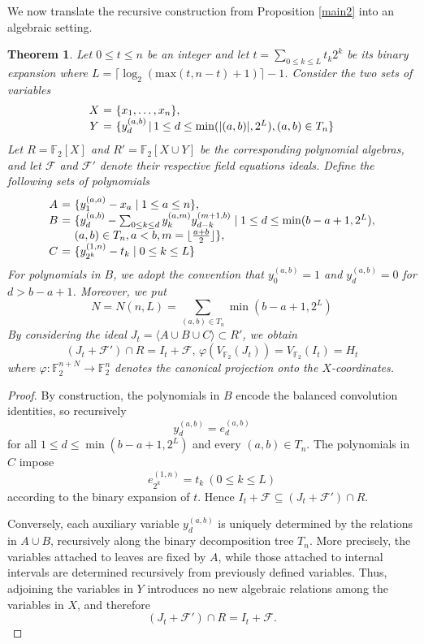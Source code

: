 \documentclass{amsart}
\newtheorem{theorem}{Theorem}[section]
\def\FF{{\mathbb F}}
\def\cF{{\mathcal{F}}}
\def\max{{\mathrm{max}}}
\begin{document}
We now translate the recursive construction from Proposition \ref{main2} into
an algebraic setting.

\begin{theorem}
\label{main3}
Let $0\leq t\leq n$ be an integer and let $t = \sum_{0\leq k\leq L} t_k 2^k$
be its binary expansion where $L = \lceil \log_2( \max(t,n-t) + 1 ) \rceil - 1$.
Consider the two sets of variables
\[
\begin{array}{c@{\ }c@{\ }l}
X & = & \{x_1,\ldots,x_n\}, \\
Y & = & \{ y_d^{(a,b)}\, |\, 1\leq d\leq \min(|(a,b)|,2^L), (a,b)\in T_n \}
\end{array}
\]
Let $R = \FF_2[X]$ and $R' = \FF_2[X \cup Y]$ be the corresponding polynomial algebras,
and let $\cF$ and $\cF'$ denote their respective field equations ideals.
Define the following sets of polynomials
\[
\begin{array}{c@{\ }c@{\ }l}
A & = & \{ y_1^{(a,a)} - x_a \mid 1\leq a\leq n \}, \\
B & = & \{ y_d^{(a,b)} - \sum_{0\leq k\leq d} y_k^{(a,m)} y_{d-k}^{(m+1,b)} \mid
        1\leq d\leq \min(b-a+1,2^L), \\
  &   & (a,b)\in T_n, a < b, m = \lfloor \frac{a+b}{2} \rfloor \}, \\
C & = & \{ y_{2^k}^{(1,n)} - t_k \mid 0\leq k \leq L \}
\end{array}
\]
For polynomials in $B$, we adopt the convention that $y_0^{(a,b)} = 1$ and $y_d^{(a,b)} = 0$
for $d > b-a+1$. Moreover, we put
\[
N = N(n,L) = \sum_{(a,b)\in T_n} \min(b-a+1,2^L)
\]
By considering the ideal $J_t = \langle A \cup B \cup C \rangle \subset R'$, we obtain
\[
(J_t + \cF')\cap R = I_t + \cF,\, \varphi( V_{\FF_2}(J_t) ) = V_{\FF_2}(I_t) = H_t
\]
where $\varphi:\FF_2^{n + N} \to \FF_2^n$ denotes the canonical projection onto
the $X$-coordinates.
\end{theorem}

\begin{proof}
By construction, the polynomials in $B$ encode the balanced convolution identities,
so recursively
\[
y_d^{(a,b)} = e_d^{(a,b)}
\]
for all $1\le d\le \min(b-a+1,2^L)$ and every $(a,b)\in T_n$. The polynomials in $C$
impose
\[
e_{2^k}^{(1,n)} = t_k\ (0\le k\le L)
\]
according to the binary expansion of $t$. Hence $I_t + \cF\subseteq (J_t + \cF')\cap R$.

Conversely, each auxiliary variable $y_d^{(a,b)}$ is uniquely determined by the
relations in $A\cup B$, recursively along the binary decomposition tree $T_n$.
More precisely, the variables attached to leaves are fixed by $A$, while those attached to
internal intervals are determined recursively from previously defined variables.
Thus, adjoining the variables in $Y$ introduces no new algebraic relations
among the variables in $X$, and therefore
\[
(J_t + \cF')\cap R = I_t + \cF.
\]
\end{proof}
\end{document}
